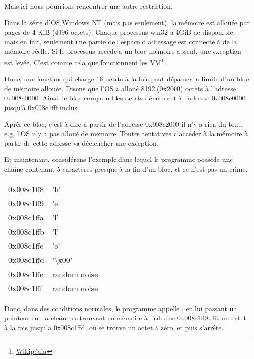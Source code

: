 Mais ici nous pourrions rencontrer une autre restriction:

\newcommand{\URLPAGE}{\href{http://go.yurichev.com/17136}{Wikipédia}}

Dans la série d'\ac{OS} \gls{Windows NT} (mais pas seulement), la mémoire est allouée
par pages de 4 KiB (4096 octets).
Chaque processus win32 a 4GiB de disponible, mais en fait, seulement une partie
de l'espace d'adressage est connecté à de la mémoire réelle.
Si le processus accède a un bloc mémoire absent, une exception est levée.
C'est comme cela que fonctionnent les \ac{VM}\footnote{\URLPAGE}.

Donc, une fonction qui charge 16 octets à la fois peut dépasser la limite d'un bloc
de mémoire allouée.
Disons que l'\ac{OS} a alloué 8192 (0x2000) octets à l'adresse 0x008c0000.
Ainsi, le bloc comprend les octets démarrant à l'adresse 0x008c0000 jusqu'à 0x008c1fff
inclus.

Après ce bloc, c'est à dire à partir de l'adresse 0x008c2000 il n'y a rien du tout,
e.g. l'\ac{OS} n'y a pas alloué de mémoire.
Toutes tentatives d'accéder à la mémoire à partir de cette adresse va déclencher
une exception.

Et maintenant, considérons l'exemple dans lequel le programme possède une chaîne
contenant 5 caractères presque à la fin d'un bloc, et ce n'est pas un crime.

\begin{center}
  \begin{tabular}{ | l | l | }
    \hline
        0x008c1ff8 & 'h' \\
        0x008c1ff9 & 'e' \\
        0x008c1ffa & 'l' \\
        0x008c1ffb & 'l' \\
        0x008c1ffc & 'o' \\
        0x008c1ffd & '\textbackslash{}x00' \\
        0x008c1ffe & random noise \\
        0x008c1fff & random noise \\
    \hline
  \end{tabular}
\end{center}

Donc, dans des conditions normales, le programme appelle \strlen, en lui passant un
pointeur sur la chaîne  se trouvant en mémoire à l'adresse 0x008c1ff8.
\strlen lit un octet à la fois jusqu'à 0x008c1ffd, où se trouve un octet à zéro,
et puis s'arrête.

